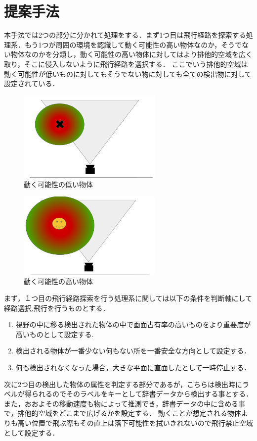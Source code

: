 \documentclass[a4j,10pt]{jsarticle}
\begin{document}
\section{提案手法}
本手法では2つの部分に分かれて処理をする．まず1つ目は飛行経路を探索する処理系．もう1つが周囲の環境を認識して動く可能性の高い物体なのか，そうでない物体なのかを分類し，動く可能性の高い物体に対してはより排他的空域を広く取り，そこに侵入しないように飛行経路を選択する．
ここでいう排他的空域は動く可能性が低いものに対してもそうでない物に対しても全ての検出物に対して設定されている．

\begin{figure}[htbp]
  \includegraphics[width=7cm]{figure1.png}
  \caption{動く可能性の低い物体}
\end{figure}
\begin{figure}[htbp]
  \includegraphics[width=7cm]{figure2.png}
  \caption{動く可能性の高い物体}
\end{figure}

まず，１つ目の飛行経路探索を行う処理系に関しては以下の条件を判断軸にして経路選択,飛行を行うものとする．

\begin{enumerate}
\item 視野の中に移る検出された物体の中で画面占有率の高いものをより重要度が高いものとして設定する.
\item 検出される物体が一番少ない何もない所を一番安全な方向として設定する．
\item 何も検出されなくなった場合，大きな平面に直面したとして一時停止する．
\end{enumerate}

次に2つ目の検出した物体の属性を判定する部分であるが，こちらは検出時にラベルが得られるのでそのラベルをキーとして辞書データから検出する事とする．
また，おおよその移動速度も物によって推測でき，辞書データの中に含める事で，排他的空域をどこまで広げるかを設定する．
動くことが想定される物体よりも高い位置で飛ぶ際もその直上は落下可能性を拭いきれないので飛行禁止空域として設定する．
\end{document}

